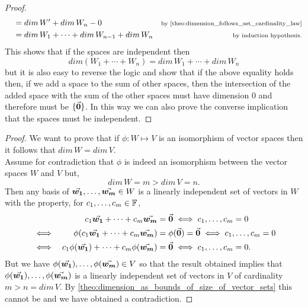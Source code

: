 \documentclass[MathsNotesBase.tex]{subfiles}
\begin{document}
{\begin{proof}
\begin{align*}
		& &  &= dim\,W' + dim\,W_n - 0  &\sidecomment{by \autoref{theo:dimension_follows_set_cardinality_law}} \\
		& &  &= dim\,W_1 + \cdots + dim\,W_{n-1} + dim\,W_n  &\sidecomment{by induction hypothesis.}
		\end{align*}
		This shows that if the spaces are independent then 
		\[ dim(W_1 + \cdots + W_n) = dim\,W_1 + \cdots + dim\,W_n \]
		but it is also easy to reverse the logic and show that if the above equality holds then, if we add a space to the sum of other spaces, then the intersection of the added space with the sum of the other spaces must have dimension 0 and therefore must be $\{\vec{\bm{0}}\}$. In this way we can also prove the converse implication that the spaces must be independent.
	\end{proof}

	\bigskip
	\begin{proof}
		We want to prove that if ${ \phi: W \longmapsto V }$ is an isomorphism of vector spaces then it follows that ${ dim\,W = dim\,V }$.\\
		Assume for contradiction that $\phi$ is indeed an isomorphism between the vector spaces $W$ and $V$ but,
		\[ dim\,W = m > dim\,V = n. \]
		Then any basis of ${ \vec{\bm{w_1}}, \dots, \vec{\bm{w_m}} \in W }$ is a linearly independent set of vectors in $W$ with the property, for ${ c_1,\dots,c_m \in \mathbb{F}^{} }$,
		\begin{align*}
		&& c_1\vec{\bm{w_1}} + \dots + c_m\vec{\bm{w_m}} &= \vec{\bm{0}} \iff c_1,\dots,c_m = 0  \\
		&\iff & \phi(c_1\vec{\bm{w_1}} + \dots + c_m\vec{\bm{w_m}}) &= \phi(\vec{\bm{0}}) = \vec{\bm{0}} \iff c_1,\dots,c_m = 0 \\
		&\iff & c_1\phi(\vec{\bm{w_1}}) + \dots + c_m\phi(\vec{\bm{w_m}}) &= \vec{\bm{0}} \iff c_1,\dots,c_m = 0. \\
		\end{align*}
		But we have ${ \phi(\vec{\bm{w_1}}), \dots, \phi(\vec{\bm{w_m}}) \in V }$ so that the result obtained implies that ${ \phi(\vec{\bm{w_1}}), \dots, \phi(\vec{\bm{w_m}}) }$ is a linearly independent set of vectors in $V$ of cardinality ${ m > n = dim\,V }$. By \autoref{theo:dimension_as_bounds_of_size_of_vector_sets} this cannot be and we have obtained a contradiction. 
	\end{proof}

	\bigskip
	
}
\end{document}

